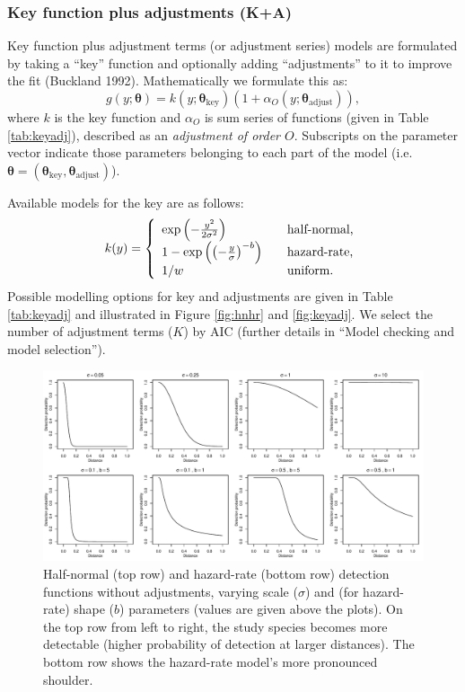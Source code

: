 \documentclass[article]{jss}
\begin{document}
\subsubsection{Key function plus adjustments
(K+A)}\label{key-function-plus-adjustments-ka}

Key function plus adjustment terms (or adjustment series) models are
formulated by taking a ``key'' function and optionally adding
``adjustments'' to it to improve the fit (Buckland 1992). Mathematically
we formulate this as: \[
g(y; \boldsymbol{\theta}) = k(y; \boldsymbol{\theta}_\text{key})\left( 1+ \alpha_O(y; \boldsymbol{\theta}_\text{adjust})\right),
\] where \(k\) is the key function and \(\alpha_O\) is sum series of
functions (given in Table \ref{tab:keyadj}), described as an
\emph{adjustment of order \(O\)}. Subscripts on the parameter vector
indicate those parameters belonging to each part of the model (i.e.
\(\boldsymbol{\theta} = (\boldsymbol{\theta}_\text{key}, \boldsymbol{\theta}_\text{adjust})\)).

Available models for the key are as follows: \[
k(y) = \left\{
\begin{array}{l l}
  \exp\left(-\frac{y^2}{2 \sigma^2}\right) & \quad \text{half-normal,} \\
  1-\exp\left(\left(-\frac{y}{\sigma}\right)^{-b}\right) & \quad \text{hazard-rate,} \\
  1/w & \quad \text{uniform.}
\end{array} \right.
\] Possible modelling options for key and adjustments are given in Table
\ref{tab:keyadj} and illustrated in Figure \ref{fig:hnhr} and
\ref{fig:keyadj}. We select the number of adjustment terms (\(K\)) by
AIC (further details in ``Model checking and model selection'').

\begin{CodeChunk}
\begin{figure}

{\centering \includegraphics{paper_files/figure-latex/hn-hr-par-comp-1} 

}

\caption{Half-normal (top row) and hazard-rate (bottom row) detection functions without adjustments, varying scale ($\sigma$) and (for hazard-rate) shape ($b$) parameters (values are given above the plots). On the top row from left to right, the study species becomes more detectable (higher probability of detection at larger distances). The bottom row shows the hazard-rate model's more pronounced shoulder.\label{fig:hnhr}}\label{fig:hn-hr-par-comp}
\end{figure}
\end{CodeChunk}
\end{document}
